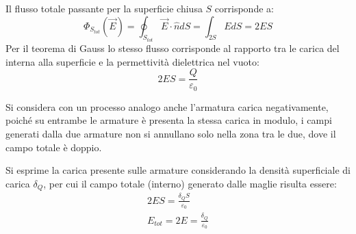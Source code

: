 \documentclass{article}
\numberwithin{equation}{subsection}
\begin{document}
Il flusso totale passante per la superficie chiusa $S$ corrisponde a:
\begin{equation*}
    \Phi_{S_{tot}}(\vec{E})=\displaystyle\oint_{S_{tot}}\vec{E}\cdot\hat{n}dS=\int_{2S}EdS=2ES
\end{equation*}
Per il teorema di Gauss lo stesso flusso corrisponde al rapporto tra le carica del interna alla superficie e la permettività dielettrica nel vuoto:
\begin{equation*}
    2ES=\displaystyle\frac{Q}{\varepsilon_0}
\end{equation*}

Si considera con un processo analogo anche l'armatura carica negativamente, poiché su entrambe le armature è presenta la stessa carica in modulo, i campi generati dalla due 
armature non si annullano solo nella zona tra le due, dove il campo totale è doppio. 
\begin{center}
\end{center}

Si esprime la carica presente sulle armature considerando la densità superficiale di carica $\delta_Q$, per cui il campo totale (interno) generato dalle maglie risulta essere:
\begin{gather*}
    2ES=\displaystyle\frac{\delta_QS}{\varepsilon_0}\\
    E_{tot}=2E=\displaystyle\frac{\delta_Q}{\varepsilon_0}
\end{gather*}
\end{document}
